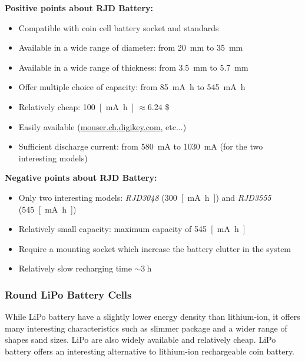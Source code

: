 \documentclass[report.tex]{subfiles}
\begin{document}
\begin{flushleft}
\textbf{Positive points about RJD Battery:}
\end{flushleft}
\begin{itemize}[\textcolor{mygreen}{+}]
\item Compatible with coin cell battery socket and standards
\item Available in a wide range of diameter: from \SI{20}{\milli\meter} to \SI{35}{\milli\meter} 
\item Available in a wide range of thickness: from \SI{3.5}{\milli\meter} to \SI{5.7}{\milli\meter} 
\item Offer multiple choice of capacity: from \SI{85}{\milli\ampere\hour} to \SI{545}{\milli\ampere\hour}
\item Relatively cheap: \SI{100}{[\milli\ampere\hour]} $\approx 6.24$ \$
\item Easily available (\url{mouser.ch},\url{digikey.com}, etc...)
\item Sufficient discharge current: from \SI{580}{\milli\ampere} to  \SI{1030}{\milli\ampere} (for the two interesting models)
\end{itemize}

\pagebreak

\begin{flushleft}
\textbf{Negative points about RJD Battery:}
\end{flushleft}
\begin{itemize}[\textcolor{red}{-}]
\item Only two interesting models: \textit{RJD3048} (\SI{300}{[\milli\ampere\hour]}) and \textit{RJD3555} (\SI{545}{[\milli\ampere\hour]})
\item Relatively small capacity: maximum capacity of \SI{545}{[\milli\ampere\hour]}
\item Require a mounting socket which increase the battery clutter in the system
\item Relatively slow recharging time $\sim \SI{3}{\hour}$
\end{itemize}

\subsubsection{Round LiPo Battery Cells}

While LiPo battery have a slightly lower energy density than lithium-ion, it offers many interesting characteristics such as slimmer package and a wider range of shapes sand sizes. LiPo are also widely available and relatively cheap. LiPo battery offers an interesting alternative to lithium-ion rechargeable coin battery.
\end{document}

